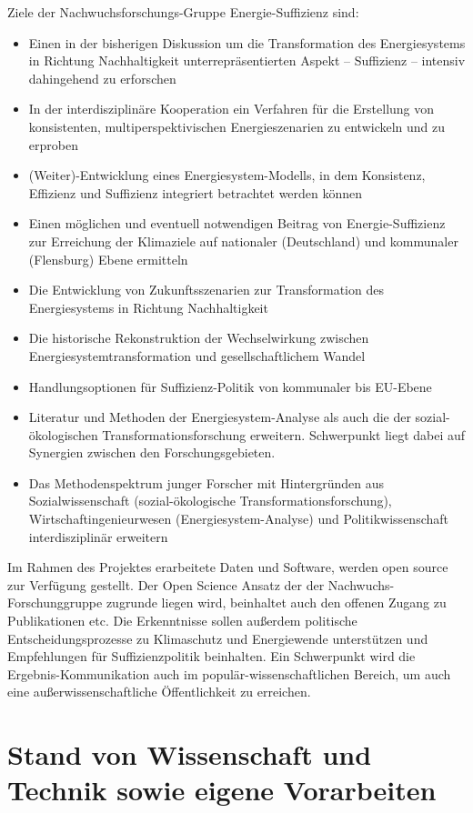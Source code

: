 \documentclass[a4paper,11pt,twoside]{scrartcl}
\begin{document}
Ziele der Nachwuchsforschungs-Gruppe Energie-Suffizienz sind:
\begin{itemize}
 \item Einen in der bisherigen Diskussion um die Transformation des Energiesystems in Richtung Nachhaltigkeit unterrepräsentierten Aspekt  -- Suffizienz -- intensiv dahingehend zu erforschen
  \item In der interdisziplinäre Kooperation ein Verfahren für die Erstellung von konsistenten, multiperspektivischen  Energieszenarien zu entwickeln und zu erproben
  \item (Weiter)-Entwicklung eines Energiesystem-Modells, in dem Konsistenz, Effizienz und Suffizienz integriert betrachtet werden können
 \item Einen möglichen und eventuell notwendigen Beitrag von Energie-Suffizienz zur Erreichung der Klimaziele auf nationaler (Deutschland) und kommunaler (Flensburg) Ebene ermitteln
 \item Die Entwicklung von Zukunftsszenarien zur Transformation des Energiesystems in Richtung Nachhaltigkeit 
 \item Die historische Rekonstruktion der Wechselwirkung zwischen Energiesystemtransformation und gesellschaftlichem Wandel  
 \item Handlungsoptionen für Suffizienz-Politik von kommunaler bis EU-Ebene
 \item Literatur und Methoden der Energiesystem-Analyse als auch die der sozial-ökologischen Transformationsforschung erweitern. Schwerpunkt liegt dabei auf Synergien zwischen den Forschungsgebieten.
 \item Das Methodenspektrum junger Forscher mit Hintergründen aus Sozialwissenschaft (sozial-ökologische Transformationsforschung), Wirtschaftingenieurwesen (Energiesystem-Analyse) und Politikwissenschaft interdisziplinär erweitern
\end{itemize}

Im Rahmen des Projektes erarbeitete Daten und Software, werden open source zur Verfügung gestellt. Der Open Science Ansatz der der Nachwuchs-Forschunggruppe zugrunde liegen wird, beinhaltet auch den offenen Zugang zu Publikationen etc. Die Erkenntnisse sollen außerdem politische Entscheidungsprozesse zu Klimaschutz und Energiewende unterstützen und Empfehlungen für Suffizienzpolitik beinhalten. Ein Schwerpunkt wird die Ergebnis-Kommunikation auch im populär-wissenschaftlichen Bereich, um auch eine außerwissenschaftliche Öffentlichkeit zu erreichen.

\section{Stand von Wissenschaft und Technik sowie eigene Vorarbeiten}
\end{document}
